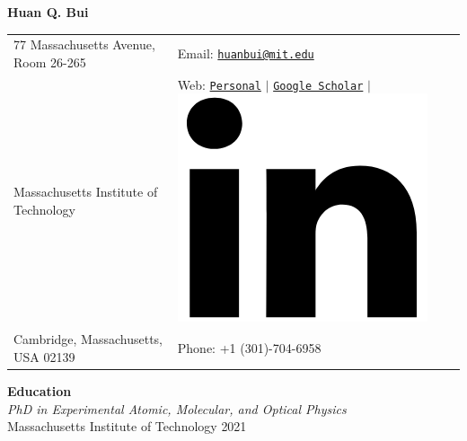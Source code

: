 \documentclass[10pt]{article}
\begin{document}
\noindent  
\begin{center}
{\Huge{\textbf{Huan Q. Bui}}}
\end{center}
\vspace{-10pt}
\hrulefill
\vspace{-1ex}

\normalsize

\begin{center}
\begin{tabular}{l l}
     77 Massachusetts Avenue, Room 26-265		 & \hspace{1in} Email: \href{mailto:huanbui@mit.edu}{\texttt{huanbui@mit.edu}} \\
     Massachusetts Institute of Technology				 & \hspace{1in}  Web: \href{www.huanqbui.com}{\texttt{Personal}} 
     $\vert$ 	\href{https://scholar.google.com/citations?user=ejxM5pkAAAAJ\&hl=en}{\texttt{Google Scholar}} 
     $\vert$ 					\href{https://www.linkedin.com/in/huan-bui/}{\includegraphics[scale=0.04]{linkedin_logo.PNG}} \\
 	Cambridge, Massachusetts, USA 02139 & \hspace{1in} Phone: +1 (301)-704-6958\\
\end{tabular}
\end{center}




\vspace{10pt}
\noindent\large{\textbf{{Education}}} \normalsize\\

\vspace{-5pt}
\noindent \textit{PhD in Experimental Atomic, Molecular, and Optical Physics} \\
Massachusetts Institute of Technology \hfill {2021\textendash}\\
\end{document}

